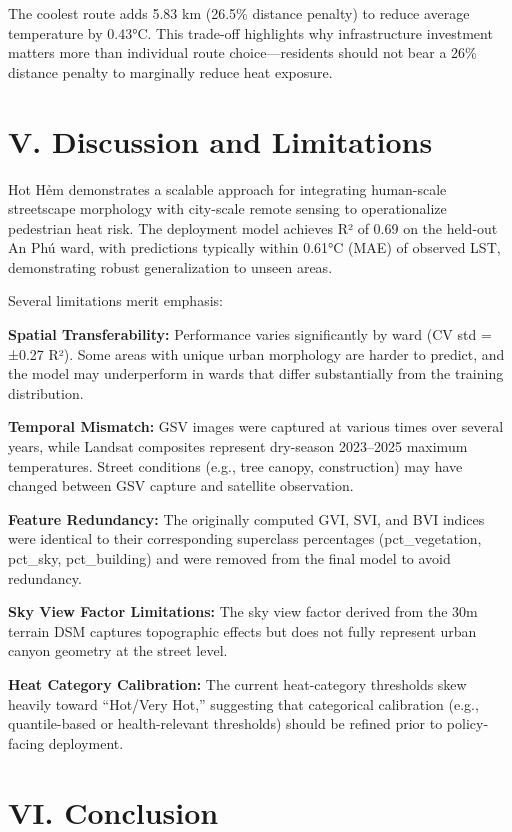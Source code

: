 \documentclass[
]{report}
\begin{document}
The coolest route adds 5.83 km (26.5\% distance penalty) to reduce
average temperature by 0.43°C. This trade-off highlights why
infrastructure investment matters more than individual route
choice---residents should not bear a 26\% distance penalty to marginally
reduce heat exposure.

\chapter{V. Discussion and
Limitations}\label{v.-discussion-and-limitations}

Hot Hẻm demonstrates a scalable approach for integrating human-scale
streetscape morphology with city-scale remote sensing to operationalize
pedestrian heat risk. The deployment model achieves R² of 0.69 on the
held-out An Phú ward, with predictions typically within 0.61°C (MAE) of
observed LST, demonstrating robust generalization to unseen areas.

Several limitations merit emphasis:

\textbf{Spatial Transferability:} Performance varies significantly by
ward (CV std = ±0.27 R²). Some areas with unique urban morphology are
harder to predict, and the model may underperform in wards that differ
substantially from the training distribution.

\textbf{Temporal Mismatch:} GSV images were captured at various times
over several years, while Landsat composites represent dry-season
2023--2025 maximum temperatures. Street conditions (e.g., tree canopy,
construction) may have changed between GSV capture and satellite
observation.

\textbf{Feature Redundancy:} The originally computed GVI, SVI, and BVI
indices were identical to their corresponding superclass percentages
(pct\_vegetation, pct\_sky, pct\_building) and were removed from the
final model to avoid redundancy.

\textbf{Sky View Factor Limitations:} The sky view factor derived from
the 30m terrain DSM captures topographic effects but does not fully
represent urban canyon geometry at the street level.

\textbf{Heat Category Calibration:} The current heat-category thresholds
skew heavily toward ``Hot/Very Hot,'' suggesting that categorical
calibration (e.g., quantile-based or health-relevant thresholds) should
be refined prior to policy-facing deployment.

\chapter{VI. Conclusion}\label{vi.-conclusion}
\end{document}

